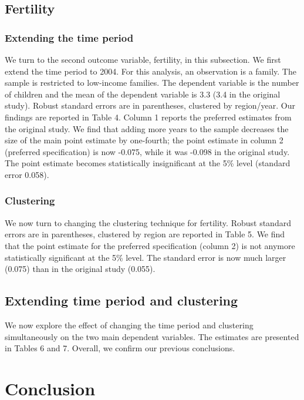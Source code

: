 \documentclass[12pt,a4paper]{article}
\begin{document}
\subsection{Fertility}

\subsubsection{Extending the time period}

We turn to the second outcome variable, fertility, in this subsection. We first extend the time period to 2004. For this analysis, an observation is a family. The sample is restricted to low-income families. The dependent variable is the number of children and the mean of the dependent variable is 3.3 (3.4 in the original study). Robust standard errors are in parentheses, clustered by region/year. Our findings are reported in Table 4. Column 1 reports the preferred estimates from the original study.
We find that adding more years to the sample decreases the size of the main point estimate by one-fourth; the point estimate in column 2 (preferred specification) is now -0.075, while it was -0.098 in the original study. The point estimate becomes statistically insignificant at the 5\% level (standard error 0.058).


\subsubsection{Clustering}

We now turn to changing the clustering technique for fertility. Robust standard errors are in parentheses, clustered by region are reported in Table 5. We find that the point estimate for the preferred specification (column 2) is not anymore statistically significant at the 5\% level. The standard error is now much larger (0.075) than in the original study (0.055).

\subsection{Extending time period and clustering}

We now explore the effect of changing the time period and clustering simultaneously on the two main dependent variables. The estimates are presented in Tables 6 and 7. Overall, we confirm our previous conclusions. 

\section{Conclusion}
\end{document}
